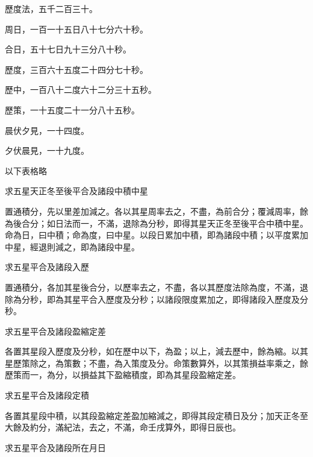 \begin{pinyinscope}
 歷度法，五千二百三十。



 周日，一百一十五日八十七分六十秒。



 合日，五十七日九十三分八十秒。



 歷度，三百六十五度二十四分七十秒。



 歷中，一百八十二度六十二分三十五秒。



 歷策，一十五度二十一分八十五秒。



 晨伏夕見，一十四度。



 夕伏晨見，一十九度。



 以下表格略



 求五星天正冬至後平合及諸段中積中星



 置通積分，先以里差加減之。各以其星周率去之，不盡，為前合分；覆減周率，餘為後合分；如日法而一，不滿，退除為分秒，即得其星天正冬至後平合中積中星。命為日，曰中積；命為度，曰中星。以段日累加中積，即為諸段中積；以平度累加中星，經退則減之，即為諸段中星。



 求五星平合及諸段入歷



 置通積分，各加其星後合分，以歷率去之，不盡，各以其歷度法除為度，不滿，退除為分秒，即為其星平合入歷度及分秒；以諸段限度累加之，即得諸段入歷度及分秒。



 求五星平合及諸段盈縮定差



 各置其星段入歷度及分秒，如在歷中以下，為盈；以上，減去歷中，餘為縮。以其星歷策除之，為策數；不盡，為入策度及分。命策數算外，以其策損益率乘之，餘歷策而一，為分，以損益其下盈縮積度，即為其星段盈縮定差。



 求五星平合及諸段定積



 各置其星段中積，以其段盈縮定差盈加縮減之，即得其段定積日及分；加天正冬至大餘及約分，滿紀法，去之，不滿，命壬戌算外，即得日辰也。



 求五星平合及諸段所在月日




\end{pinyinscope}
